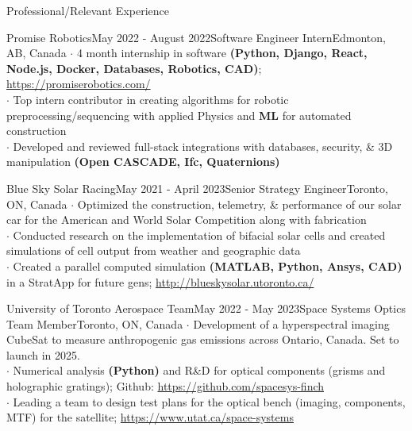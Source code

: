 \documentclass[UTF8]{resume} %
\begin{document}
\begin{rSection}{Professional/Relevant Experience}
\begin{rSubsection}{Promise Robotics}{May 2022 - August 2022}{Software Engineer Intern}{Edmonton, AB, Canada}
    $\cdot$ 4 month internship in software \textbf{(Python, Django, React, Node.js, Docker, Databases, Robotics, CAD)}; \href{https://promiserobotics.com/}{https://promiserobotics.com/}\\
    $\cdot$ Top intern contributor in creating algorithms for robotic preprocessing/sequencing with applied Physics and \textbf{ML} for automated construction  \\
    $\cdot$ Developed and reviewed full-stack integrations with databases, security, \& 3D manipulation \textbf{(Open CASCADE, Ifc, Quaternions)}
\end{rSubsection}
\begin{rSubsection}{Blue Sky Solar Racing}{May 2021 - April 2023}{Senior Strategy Engineer}{Toronto, ON, Canada}
    $\cdot$ Optimized the construction, telemetry, \& performance of our solar car for the American and World Solar Competition along with fabrication\\
    $\cdot$ Conducted research on the implementation of bifacial solar cells and created simulations of cell output from weather and geographic data\\
    $\cdot$ Created a parallel computed simulation \textbf{(MATLAB, Python, Ansys, CAD)} in a StratApp for future gens; \href{http://blueskysolar.utoronto.ca/}{http://blueskysolar.utoronto.ca/}
\end{rSubsection}
\begin{rSubsection}{University of Toronto Aerospace Team}{May 2022 - May 2023}{Space Systems Optics Team Member}{Toronto, ON, Canada}
    $\cdot$ Development of a hyperspectral imaging CubeSat to measure anthropogenic gas emissions across Ontario, Canada. Set to launch in 2025. \\
    $\cdot$ Numerical analysis \textbf{(Python)} and R\&D for optical components (grisms and holographic gratings); Github: \href{https://github.com/spacesys-finch}{https://github.com/spacesys-finch}\\
    $\cdot$ Leading a team to design test plans for the optical bench (imaging, components, MTF) for the satellite; \href{https://www.utat.ca/space-systems}{https://www.utat.ca/space-systems}
\end{rSubsection}
\end{rSection}
~\vspace{-0.2cm}
\end{document}
